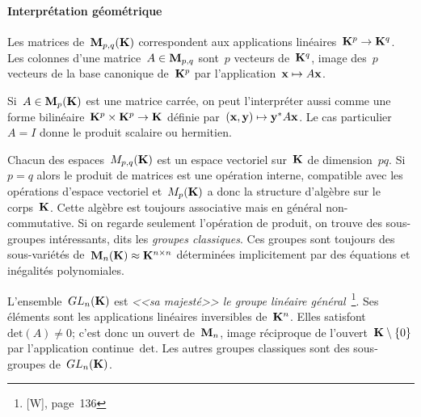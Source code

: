 \paragraph{Interprétation géométrique}

Les matrices de~$\mathbf{M}_{p,q}(\mathbf{K})$ correspondent aux applications
linéaires~$\mathbf{K}^p\to\mathbf{K}^q$.  Les colonnes d'une matrice~$A\in\mathbf{M}_{p,q}$ sont~$p$
vecteurs de~$\mathbf{K}^q$, image des~$p$ vecteurs de la base canonique de~$\mathbf{K}^p$ par
l'application~$\mathbf{x}\mapsto A\mathbf{x}$.

%

Si~$A\in\mathbf{M}_p(\mathbf{K})$ est une matrice carrée, on peut l'interpréter aussi comme
une forme bilinéaire~$\mathbf{K}^p\times\mathbf{K}^p\to\mathbf{K}$ définie par~$(\mathbf{x},\mathbf{y})\mapsto
\mathbf{y}^*A\mathbf{x}$.  Le cas particulier~$A=I$ donne le produit scalaire ou hermitien.

Chacun des espaces~$M_{p,q}(\mathbf{K})$ est un espace vectoriel sur~$\mathbf{K}$ de
dimension~$pq$.  Si~$p=q$ alors le produit de matrices est une opération
interne, compatible avec les opérations d'espace vectoriel et~$M_p(\mathbf{K})$ a
donc la structure d'algèbre sur le corps~$\mathbf{K}$.  Cette algèbre est toujours
associative mais en général non-commutative.  Si on regarde seulement
l'opération de produit, on trouve des sous-groupes intéressants, dits les
\emph{groupes classiques}.  Ces groupes sont toujours des sous-variétés
de~$\mathbf{M}_n(\mathbf{K})\approx\mathbf{K}^{n\times n}$ déterminées implicitement par des
équations et inégalités polynomiales.

L'ensemble~$GL_n(\mathbf{K})$ est \emph{<<sa majesté>> le groupe linéaire
général}~\footnote{[W], page~136}.
Ses éléments sont les applications linéaires inversibles de~$\mathbf{K}^n$.  Elles
satisfont~$\textrm{det}(A)\neq 0$; c'est donc un ouvert de~$\mathbf{M}_n$,
image réciproque de l'ouvert~$\mathbf{K}\setminus\{0\}$ par l'application
continue~$\textrm{det}$.
Les autres groupes classiques sont des sous-groupes de~$GL_n(\mathbf{K})$.


